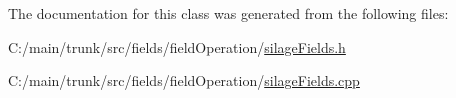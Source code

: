 The documentation for this class was generated from the following files:\begin{DoxyCompactItemize}
\item 
C:/main/trunk/src/fields/fieldOperation/\hyperlink{silage_fields_8h}{silageFields.h}\item 
C:/main/trunk/src/fields/fieldOperation/\hyperlink{silage_fields_8cpp}{silageFields.cpp}\end{DoxyCompactItemize}
